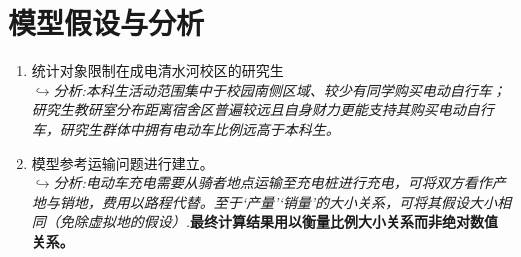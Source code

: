 \section{模型假设与分析}
\begin{enumerate}
    \item 统计对象限制在成电清水河校区的研究生\\
    $\hookrightarrow $\textit{分析:本科生活动范围集中于校园南侧区域、较少有同学购买电动自行车；研究生教研室分布距离宿舍区普遍较远且自身财力更能支持其购买电动自行车，研究生群体中拥有电动车比例远高于本科生。} 
  
    \item 模型参考运输问题进行建立。\\
    $\hookrightarrow $\textit{分析:电动车充电需要从骑者地点运输至充电桩进行充电，可将双方看作产地与销地，费用以路程代替。至于‘产量’‘销量’的大小关系，可将其假设大小相同（免除虚拟地的假设）.}\textbf{最终计算结果用以衡量比例大小关系而非绝对数值关系。} 

\end{enumerate}